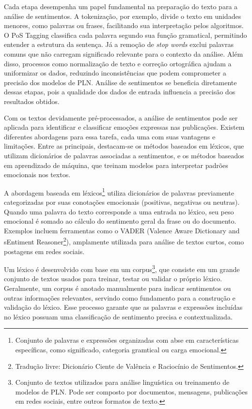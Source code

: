 \documentclass[
	12pt,				%
	oneside,			%
	a4paper,			%
	english,			%
	french,				%
	spanish,			%
	brazil				%
	]{abntex2}
\begin{document}
Cada etapa desempenha um papel fundamental na preparação do texto para a
análise de sentimentos. A tokenização, por exemplo, divide o texto em
unidades menores, como palavras ou frases, facilitando sua interpretação
pelos algoritmos. O PoS Tagging classifica cada palavra segundo sua
função gramatical, permitindo entender a estrutura da sentença. Já a
remoção de \emph{stop words} exclui palavras comuns que não carregam
significado relevante para o contexto da análise. Além disso, processos
como normalização de texto e correção ortográfica ajudam a uniformizar
os dados, reduzindo inconsistências que podem comprometer a precisão dos
modelos de PLN. Análise de sentimentos se beneficia diretamente dessas
etapas, pois a qualidade dos dados de entrada influencia a precisão dos
resultados obtidos.

Com os textos devidamente pré-processados, a análise de sentimentos pode
ser aplicada para identificar e classificar emoções expressas nas
publicações. Existem diferentes abordagens para essa tarefa, cada uma
com suas vantagens e limitações. Entre as principais, destacam-se os
métodos baseados em léxicos, que utilizam dicionários de palavras
associadas a sentimentos, e os métodos baseados em aprendizado de
máquina, que treinam modelos para interpretar padrões emocionais nos
textos.

A abordagem baseada em léxicos\footnote{Conjunto de palavras e
  expressões organizadas com abse em características específicas, como
  significado, categoria gramtical ou carga emocional.} utiliza
dicionários de palavras previamente categorizadas por suas conotações
emocionais (positivas, negativas ou neutras). Quando uma palavra do
texto corresponde a uma entrada no léxico, seu peso emocional é somado
ao cálculo do sentimento geral da frase ou do documento. Exemplos
incluem ferramentas como o VADER (Valence Aware Dictionary and sEntiment
Reasoner\footnote{Tradução livre: Dicionário Ciente de Valência e
  Raciocínio de Sentimentos.}), amplamente utilizada para análise de
textos curtos, como postagens em redes sociais.

Um léxico é desenvolvido com base em um corpus\footnote{Conjunto de
  textos utilizados para análise linguística ou treinamento de modelos
  de PLN. Pode ser composto por documentos, mensagens, publicações em
  redes sociais, entre outros formatos de texto.}, que consiste em um
grande conjunto de textos usados para treinar, testar ou validar o
próprio léxico. Geralmente, um corpus é anotado manualmente para indicar
sentimentos ou outras informações relevantes, servindo como fundamento
para a construção e validação do léxico. Esse processo garante que as
palavras e expressões incluídas no léxico possuam uma classificação de
sentimento precisa e contextualizada.
\end{document}
